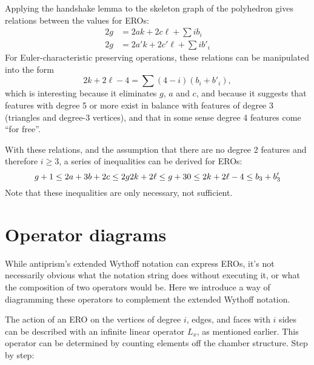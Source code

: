 \documentclass{article}
\begin{document}
Applying the handshake lemma to the skeleton graph of the polyhedron gives
relations between the values for EROs:
\begin{equation}
  \begin{split}
   2g &= 2ak + 2c\ell + \sum i b_i \\
   2g &= 2a'k + 2c'\ell + \sum i b'_i
 \end{split}
\end{equation}
For Euler-characteristic preserving operations, these relations can be
manipulated into the form
\begin{equation}
  2k + 2\ell - 4 = \sum (4-i) (b_i + b'_i),
\end{equation}
which is interesting because it eliminates $g$, $a$ and $c$,
and because it suggests that features with degree 5 or more exist
in balance with features of degree 3 (triangles and degree-3 vertices),
and that in some sense degree 4 features come ``for free''.

With these relations, and the assumption that there are no degree 2 features
and therefore $i \ge 3$, a series of inequalities can be derived for EROs:
\begin{equation}
  g + 1 \le 2a + 3b + 2c \le 2g \\
  2k + 2\ell \le g + 3 \\
  0 \le 2k + 2\ell - 4 \le b_3 + b'_3 \\
\end{equation}
Note that these inequalities are only necessary, not sufficient.

\section{Operator diagrams}

While antiprism's extended Wythoff notation can express EROs, it's not
necessarily obvious what the notation string does without executing it, or
what the composition of two operators would be. Here we introduce a way of
diagramming these operators to complement the extended Wythoff notation.

The action of an ERO on the vertices of degree $i$, edges, and faces with
$i$ sides can be described with an infinite linear operator $L_x$, as mentioned
earlier. This operator can be determined by counting elements off the chamber
structure. Step by step:
\end{document}
